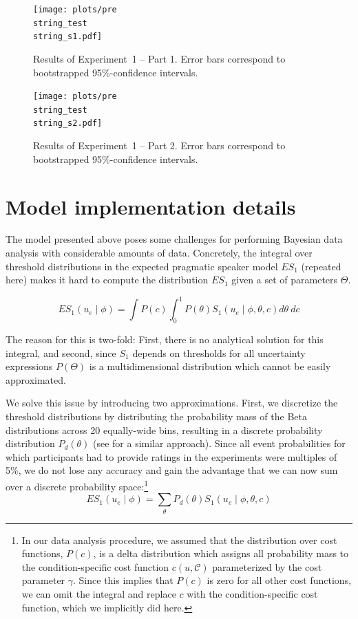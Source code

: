 \documentclass[man, floatsintext]{apa6}
\begin{document}
\begin{figure}[h!]
\texttt{[image: plots/pre\\string\_test\\string\_s1.pdf]}
\caption{Results of Experiment~1 -- Part 1. Error bars correspond to bootstrapped 95\%-confidence intervals. \label{fig:norming-results-1}}
\end{figure}

\begin{figure}[h!]
\texttt{[image: plots/pre\\string\_test\\string\_s2.pdf]}
\caption{Results of Experiment~1  -- Part 2. Error bars correspond to bootstrapped 95\%-confidence intervals. \label{fig:norming-results-2}}
\vspace{4cm}

\end{figure}

\section{Model implementation details}
\setcounter{section}{3}

The model presented above poses some challenges for performing Bayesian data analysis with considerable amounts of data. 
Concretely, the integral over threshold distributions in the expected pragmatic speaker model $ES_1$ (repeated here) makes it hard to compute 
the distribution $ES_1$ given a set of parameters $\Theta$.

$$ES_1\left(u_e \mid \phi \right) = \int P(c) \int_0^1 P(\theta) S_1\left(u _e\mid \phi, \theta, c\right) d\theta \  d c$$

The reason for this is two-fold: First, there is no analytical solution for this integral, and second, since $S_1$ depends on
thresholds for all uncertainty expressions $P(\Theta)$ is a multidimensional distribution which cannot be easily approximated.

We solve this issue by introducing two approximations. First, we discretize the threshold distributions by distributing the probability mass
of the Beta distributions across 20 equally-wide bins, resulting in a discrete probability distribution $P_{d}(\theta)$ (see \cite{Tessler2019} for a similar approach). Since all event probabilities for which participants had to provide ratings in the
experiments were multiples of 5\%, we do not lose any accuracy and gain the advantage that we can now sum over a discrete probability space:\footnote{In our data analysis procedure, we assumed that the 
distribution over cost functions, $P(c)$, is a delta distribution which assigns all probability mass to the condition-specific cost function 
$c(u, \mathscr{C})$ parameterized by the cost parameter $\gamma$. Since this implies that $P(c)$ is zero for all other cost functions, we can omit the integral and replace $c$ 
with the condition-specific cost function, which we implicitly did here.}
$$ES_1\left(u_e \mid \phi \right) = \sum_{\theta} P_{d}(\theta) S_1\left(u _e\mid \phi, \theta, c\right)$$
\end{document}
